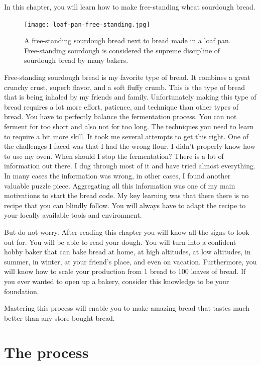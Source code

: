 In this chapter, you will learn how to make
free-standing wheat sourdough bread.

\begin{figure}[!htb]
  \texttt{[image: loaf-pan-free-standing.jpg]}
  \caption{A free-standing sourdough bread next to bread made in a loaf pan.
  Free-standing sourdough is considered the supreme discipline of sourdough bread by many bakers.
  }
\end{figure}

Free-standing sourdough bread is my favorite
type of bread. It combines a great crunchy crust, superb
flavor, and a soft fluffy crumb. This is the type of bread
that is being inhaled by my friends and family. Unfortunately
making this type of bread requires a lot more effort, patience,
and technique than other types of bread. You have to perfectly
balance the fermentation process. You can not ferment for too
short and also not for too long. The techniques you need to
learn to require a bit more skill. It took me several attempts
to get this right. One of the challenges I faced was that
I had the wrong flour. I didn't properly know how to use my oven.
When should I stop the fermentation? There is a lot of information
out there. I dug through most of it and have tried almost everything.
In many cases the information was wrong, in other cases, I
found another valuable puzzle piece. Aggregating all this
information was one of my main motivations to start the bread code.
My key learning was that there there is no recipe that
you can blindly follow. You will always have to adapt the recipe
to your locally available tools and environment. 

But do not worry. After reading this chapter you will know
all the signs to look out for. You will be able to read your dough.
You will turn into a confident hobby baker that can bake bread
at home, at high altitudes, at low altitudes, in summer, in winter,
at your friend's place, and even on vacation. Furthermore,
you will know how to scale your production from 1 bread to 100 loaves of bread.
If you ever wanted to open up a bakery, consider this knowledge to
be your foundation.

Mastering this process will enable you to make amazing bread
that tastes much better than any store-bought bread.

\section{The process}

